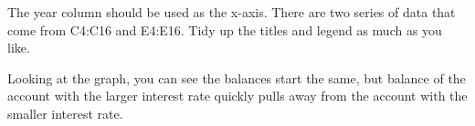 The year column should be used as the x-axis. There are two series of
data that come from C4:C16 and E4:E16.  Tidy up the titles and legend
as much as you like.

Looking at the graph, you can see the balances start the same, but
balance of the account with the larger interest rate quickly pulls
away from the account with the smaller interest rate.

